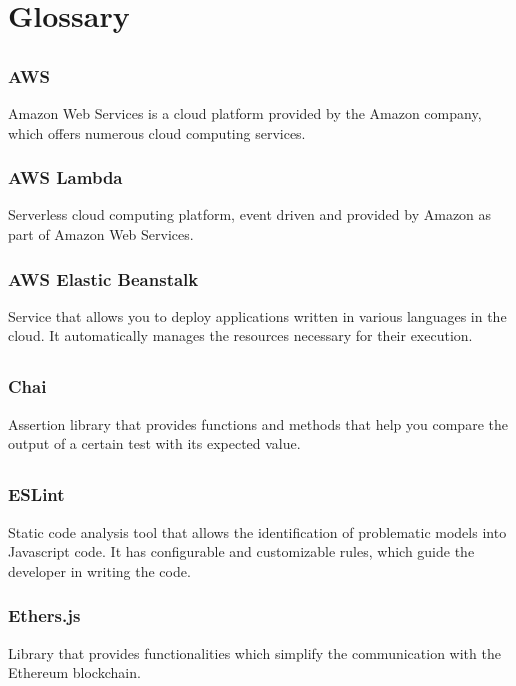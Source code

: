 \section{Glossary}
	\subsection*{}
		\subsubsection*{AWS}
			Amazon Web Services is a cloud platform provided by the Amazon company, which offers numerous cloud computing services.
		\subsubsection*{AWS Lambda}
			Serverless cloud computing platform, event driven and provided by Amazon as part of Amazon Web Services.
			
		\subsubsection*{AWS Elastic Beanstalk}
			Service that allows you to deploy applications written in various languages in the cloud. It automatically manages the resources necessary for their execution.
			
	\subsection*{}
		\subsubsection*{Chai}
			Assertion library that provides functions and methods that help you compare the output of a certain test with its expected value.
			
	\subsection*{}
		\subsubsection*{ESLint}
			Static code analysis tool that allows the identification of problematic models into Javascript code. It has configurable and customizable rules, which guide the developer in writing the code.
		\subsubsection*{Ethers.js}
			Library that provides functionalities which simplify the communication with the Ethereum blockchain.
	
